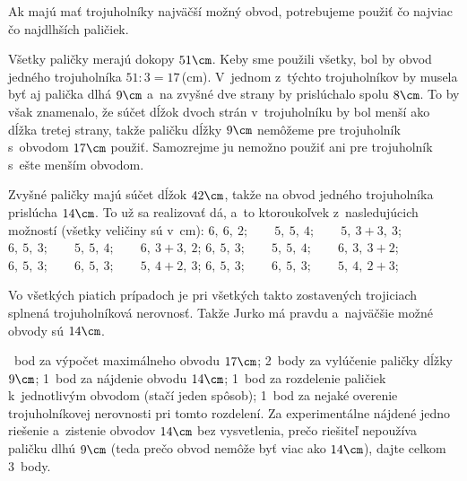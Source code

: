 {%
Ak majú mať trojuholníky najväčší možný obvod, potrebujeme použiť čo najviac
čo najdlhších paličiek.

Všetky paličky merajú dokopy $51\cm$. Keby sme použili
všetky, bol by obvod jedného trojuholníka $51 : 3 = 17$\,(cm). V~jednom
z~týchto trojuholníkov by musela byť aj palička dlhá $9\cm$ a~na zvyšné dve
strany by prislúchalo spolu $8\cm$. To by však znamenalo, že súčet dĺžok
dvoch strán v~trojuholníku by bol menší ako dĺžka tretej strany, takže paličku
dĺžky $9\cm$ nemôžeme pre trojuholník s~obvodom $17\cm$ použiť. Samozrejme ju
nemožno použiť ani pre trojuholník s~ešte menším obvodom.

Zvyšné paličky majú súčet dĺžok $42\cm$, takže na obvod jedného
trojuholníka prislúcha $14\cm$. To už sa realizovať dá, a~to ktoroukoľvek
z~nasledujúcich možností (všetky veličiny sú v~cm):
\itemitem{$\bullet$} $6,\ 6,\ 2;\qquad   5,\ 5,\ 4;\qquad   5,\ 3\!+\!3,\ 3$;
\itemitem{$\bullet$} $6,\ 5,\ 3;\qquad   5,\ 5,\ 4;\qquad   6,\ 3\!+\!3,\ 2$;
\itemitem{$\bullet$} $6,\ 5,\ 3;\qquad   5,\ 5,\ 4;\qquad   6,\ 3,\ 3\!+\!2$;
\itemitem{$\bullet$} $6,\ 5,\ 3;\qquad   6,\ 5,\ 3;\qquad   5,\ 4\!+\!2,\ 3$;
\itemitem{$\bullet$} $6,\ 5,\ 3;\qquad   6,\ 5,\ 3;\qquad   5,\ 4,\ 2\!+\!3$;

Vo všetkých piatich prípadoch je pri všetkých takto zostavených trojiciach splnená
trojuholníková nerovnosť. Takže Jurko má pravdu a~najväčšie možné obvody sú
$14\cm$.

~bod za výpočet maximálneho obvodu $17\cm$;
2~body za vylúčenie paličky dĺžky $9\cm$;
1~bod za nájdenie obvodu $14\cm$;
1~bod za rozdelenie paličiek k~jednotlivým obvodom (stačí jeden spôsob);
1~bod za nejaké overenie trojuholníkovej nerovnosti pri tomto
rozdelení.
Za experimentálne nájdené jedno riešenie a~zistenie obvodov
$14\cm$ bez vysvetlenia, prečo riešiteľ nepoužíva paličku dlhú $9\cm$ (teda prečo obvod nemôže byť viac ako $14\cm$), dajte celkom 3~body.
\endhodnotenie
}

